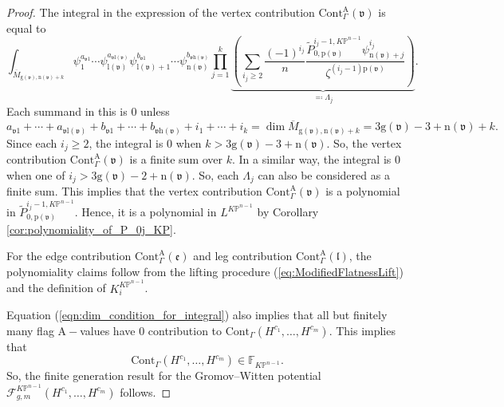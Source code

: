\documentclass[12pt]{amsart}
\numberwithin{equation}{section}
\newcommand{\KP}{K\mathbb{P}}
\begin{document}
\begin{proof}
The integral in the expression of the vertex contribution $\mathrm{Cont}_{\Gamma}^{\mathrm{A}}(\mathfrak{v})$ is equal to
\begin{equation}
\int_{\overline{M}_{\mathrm{g}(\mathfrak{v}),\mathrm{n}(\mathfrak{v})+k}}\psi_1^{a_{\mathfrak{v}1}}\cdots  \psi_{\mathrm{l}(\mathfrak{v})}^{a_{\mathfrak{v}\mathrm{l}(\mathfrak{v})}} \psi_{\mathrm{l}(\mathfrak{v})+1}^{b_{\mathfrak{v}1}} \cdots \psi_{\mathrm{n}(\mathfrak{v})}^{b_{\mathfrak{v}\mathrm{h}(\mathfrak{v})}}\prod_{j=1}^{k}\underbrace{\left(\sum_{i_j\geq{2}}\frac{(-1)^{i_j}}{n}\frac{\widetilde{P}_{0,\mathrm{p}(\mathfrak{v})}^{i_j-1,\KP^{n-1}}\psi_{\mathrm{n}(\mathfrak{v})+j}^{i_j}}{\zeta^{{(i_j-1)}\mathrm{p}(\mathfrak{v})}}\right)}_{\eqqcolon\Lambda_j}.
\end{equation}
Each summand in this is $0$ unless
\begin{equation}\label{eqn:dim_condition_for_integral}
a_{\mathfrak{v}1}+\cdots + a_{\mathfrak{v}\mathrm{l}(\mathfrak{v})}+b_{\mathfrak{v}1}+\cdots + b_{\mathfrak{v}\mathrm{h}(\mathfrak{v})}+i_1+\cdots + i_k=\dim \overline{M}_{\mathrm{g}(\mathfrak{v}),\mathrm{n}(\mathfrak{v})+k}=3\mathrm{g}(\mathfrak{v})-3+\mathrm{n}(\mathfrak{v})+k.
\end{equation}
Since each $i_j\geq 2$, the integral is 0 when $k>3\mathrm{g}(\mathfrak{v})-3+\mathrm{n}(\mathfrak{v})$. So, the vertex contribution $\mathrm{Cont}_{\Gamma}^{\mathrm{A}}(\mathfrak{v})$ is a finite sum over $k$. In a similar way, the integral is $0$ when one of $i_j>3\mathrm{g}(\mathfrak{v})-2+\mathrm{n}(\mathfrak{v})$. So, each $\Lambda_j$ can also be considered as a finite sum. This implies that the vertex contribution $\mathrm{Cont}_{\Gamma}^{\mathrm{A}}(\mathfrak{v})$ is a polynomial in $\widetilde{P}_{0,\mathrm{p}(\mathfrak{v})}^{i_j-1,\KP^{n-1}}$. Hence, it is a polynomial in $L^{\KP^{n-1}}$ by Corollary \ref{cor:polynomiality_of_P_0j_KP}.

For the edge contribution $\mathrm{Cont}_{\Gamma}^{\mathrm{A}}(\mathfrak{e})$  and leg contribution $\mathrm{Cont}_{\Gamma}^{\mathrm{A}}(\mathfrak{l})$, the polynomiality claims follow from the lifting procedure (\ref{eq:ModifiedFlatnessLift}) and the definition of $K_i^{\KP^{n-1}}$.

Equation (\ref{eqn:dim_condition_for_integral}) also implies that all but finitely many flag $\mathrm{A}-$values have $0$ contribution to $\mathrm{Cont}_{\Gamma}\left(H^{c_{1}}, \ldots, H^{c_{m}}\right)$. This implies that
\begin{equation*}
\mathrm{Cont}_{\Gamma}\left(H^{c_{1}}, \ldots, H^{c_{m}}\right)\in \mathds{F}_{\KP^{n-1}}.
\end{equation*}
So, the finite generation result for the Gromov--Witten potential $\mathcal{F}_{g, m}^{\KP^{n-1}}\left(H^{c_{1}}, \ldots, H^{c_{m}}\right)$ follows.
\end{proof}
\end{document}
